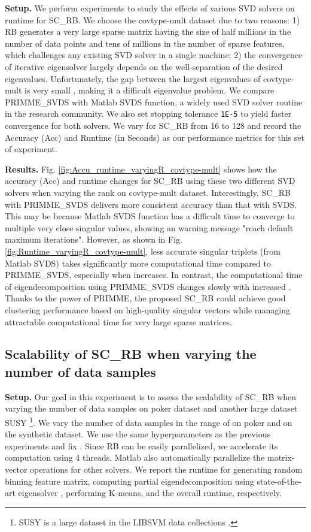 \documentclass[sigconf]{acmart}
\newcommand{\1}{\boldsymbol{1}}
\newcommand{\0}{\boldsymbol{0}}
\begin{document}
\textbf{Setup.} We perform experiments to study the effects of various SVD solvers on runtime for SC\_RB. We choose the covtype-mult dataset due to two reasons: 1) RB generates a very large sparse matrix  having the size of half millions in the number of data points and tens of millions in the number of sparse features, which challenges any existing SVD solver in a single machine; 2) the convergence of iterative eigensolver largely depends on the well-separation of the desired eigenvalues. Unfortunately, the gap between the largest eigenvalues of covtype-mult is very small , making it a difficult eigenvalue problem. We compare PRIMME\_SVDS with Matlab SVDS function, a widely used SVD solver routine in the research community. We also set stopping tolerance \texttt{1E-5} to yield faster convergence for both solvers. We vary  for SC\_RB from 16 to 128 and record the Accuracy (Acc) and Runtime (in Seconds) as our performance metrics for this set of experiment. 

\textbf{Results.} 
Fig. \ref{fig:Accu_runtime_varyingR_covtype-mult} shows how the accuracy (Acc) and runtime changes for SC\_RB using these two different SVD solvers when varying the rank  on covtype-mult dataset. Interestingly, SC\_RB with PRIMME\_SVDS delivers more consistent accuracy than that with SVDS. This may be because Matlab SVDS function has a difficult time to converge to multiple very close singular values, showing an warning message "reach default maximum iterations". However, as shown in Fig. \ref{fig:Runtime_varyingR_covtype-mult}, less accurate singular triplets (from Matlab SVDS) takes significantly more computational time compared to PRIMME\_SVDS, especially when  increases. In contrast, the computational time of eigendecomposition using PRIMME\_SVDS changes slowly with increased . Thanks to the power of PRIMME, the proposed SC\_RB could achieve good clustering performance based on high-quality singular vectors while managing attractable computational time for very large sparse matrices. 


\subsection{Scalability of SC\_RB when varying the number of data samples }

\textbf{Setup.} Our goal in this experiment is to assess the scalability of SC\_RB when varying the number of data samples  on poker dataset and another large dataset SUSY \footnote{SUSY is a large dataset in the LIBSVM data collections \cite{chang2011libsvm}.}. 
We vary the number of data samples in the range of  on poker and  on the synthetic dataset.
We use the same hyperparameters as the previous experiments and fix . Since RB can be easily parallelized, we accelerate its computation using 4 threads. Matlab also automatically parallelize the matrix-vector operations for other solvers. We report the runtime for generating random binning feature matrix, computing partial eigendecomposition using state-of-the-art eigensolver \cite{stathopoulos2010primme,wu2017primme_svds}, performing K-means, and the overall runtime, respectively.
\end{document}
